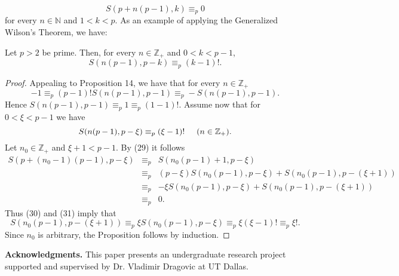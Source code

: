\documentclass[]{amsart}
\begin{document}
\begin{equation}
S(p + n(p-1),k) \equiv_{p} 0
\end{equation}
for every $n \in \mathbb{N}$ and $1 < k < p$.  As an example of applying the Generalized Wilson's Theorem, we have:
\begin{prop}
Let $p > 2$ be prime.  Then, for every $n \in \mathbb{Z}_{+}$ and $0 < k < p-1$,
\[ S(n(p-1),p-k) \equiv_{p} (k-1)!. \]
\end{prop}
\begin{proof}
Appealing to Proposition 14, we have that for every $n \in \mathbb{Z}_{+}$
\[ -1 \equiv_{p} (p-1)!S(n(p-1),p-1) \equiv_{p} -S(n(p-1),p-1). \]
Hence $S(n(p-1),p-1) \equiv_{p} 1 \equiv_{p} (1-1)!$.  Assume now that for $0 < \xi < p-1$ we have
\begin{equation}
S(n(p-1),p-\xi) \equiv_{p} (\xi-1)! \hspace{5mm} (n \in \mathbb{Z}_{+}).
\end{equation}
Let $n_{0} \in \mathbb{Z}_{+}$ and $\xi + 1 < p - 1$.  By (29) it follows
\begin{eqnarray}
S(p + (n_{0}-1)(p-1),p-\xi) & \equiv_{p} & S(n_{0}(p-1) + 1,p-\xi) \nonumber \\ \nonumber
				            & \equiv_{p} & (p-\xi)S(n_{0}(p-1),p-\xi) + S(n_{0}(p-1),p-(\xi+1)) \nonumber \\ \nonumber
				            & \equiv_{p} & -\xi S(n_{0}(p-1),p-\xi) + S(n_{0}(p-1),p-(\xi+1)) \nonumber \\ 
			                & \equiv_{p} & 0.
\end{eqnarray}
Thus (30) and (31) imply that
\[ S(n_{0}(p-1),p-(\xi+1)) \equiv_{p} \xi S(n_{0}(p-1),p-\xi) \equiv_{p} \xi(\xi-1)! \equiv_{p} \xi!. \]
Since $n_{0}$ is arbitrary, the Proposition follows by induction.
\end{proof}
\noindent
\textbf{Acknowledgments.}  This paper presents an undergraduate research project supported and supervised by Dr. Vladimir Dragovic at UT Dallas.
\end{document}
